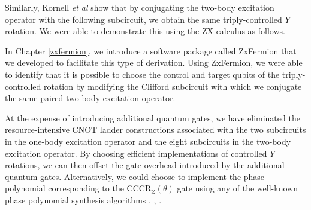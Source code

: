 Similarly, Kornell \textit{et al} \cite{Kornell2023} show that by conjugating the two-body excitation operator with the following subcircuit, we obtain the same triply-controlled $Y$ rotation. We were able to demonstrate this using the ZX calculus as follows.


In Chapter \ref{zxfermion}, we introduce a software package called ZxFermion that we developed to facilitate this type of derivation. Using ZxFermion, we were able to identify that it is possible to choose the control and target qubits of the triply-controlled rotation by modifying the Clifford subcircuit with which we conjugate the same paired two-body excitation operator.





At the expense of introducing additional quantum gates, we have eliminated the resource-intensive CNOT ladder constructions associated with the two subcircuits in the one-body excitation operator and the eight subcircuits in the two-body excitation operator. By choosing efficient implementations of controlled $Y$ rotations, we can then offset the gate overhead introduced by the additional quantum gates. Alternatively, we could choose to implement the phase polynomial corresponding to the CCCR$_Z(\theta)$ gate using any of the well-known phase polynomial synthesis algorithms \cite{Amy2013}, \cite{Amy2014}, \cite{Nam2018}.

